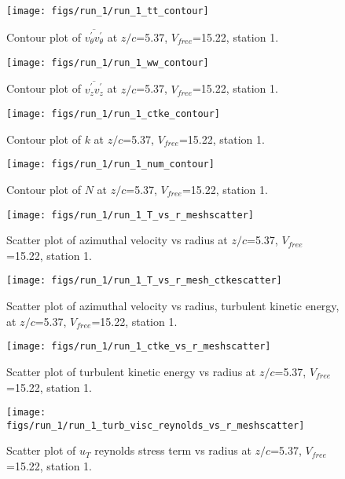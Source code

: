 \begin{figure}[H]
\centering
\texttt{[image: figs/run\_1/run\_1\_tt\_contour]}
\caption{Contour plot of $\overline{v_{\theta}^{\prime} v_{\theta}^{\prime}}$ at $z/c$=5.37, $V_{free}$=15.22, station 1.}
\end{figure}


\begin{figure}[H]
\centering
\texttt{[image: figs/run\_1/run\_1\_ww\_contour]}
\caption{Contour plot of $\overline{v_{z}^{\prime} v_{z}^{\prime}}$ at $z/c$=5.37, $V_{free}$=15.22, station 1.}
\end{figure}


\begin{figure}[H]
\centering
\texttt{[image: figs/run\_1/run\_1\_ctke\_contour]}
\caption{Contour plot of $k$ at $z/c$=5.37, $V_{free}$=15.22, station 1.}
\end{figure}


\begin{figure}[H]
\centering
\texttt{[image: figs/run\_1/run\_1\_num\_contour]}
\caption{Contour plot of $N$ at $z/c$=5.37, $V_{free}$=15.22, station 1.}
\end{figure}


\begin{figure}[H]
\centering
\texttt{[image: figs/run\_1/run\_1\_T\_vs\_r\_meshscatter]}
\caption{Scatter plot of azimuthal velocity vs radius at $z/c$=5.37, $V_{free}$=15.22, station 1.}
\end{figure}


\begin{figure}[H]
\centering
\texttt{[image: figs/run\_1/run\_1\_T\_vs\_r\_mesh\_ctkescatter]}
\caption{Scatter plot of azimuthal velocity vs radius, turbulent kinetic energy, at $z/c$=5.37, $V_{free}$=15.22, station 1.}
\end{figure}


\begin{figure}[H]
\centering
\texttt{[image: figs/run\_1/run\_1\_ctke\_vs\_r\_meshscatter]}
\caption{Scatter plot of turbulent kinetic energy vs radius at $z/c$=5.37, $V_{free}$=15.22, station 1.}
\end{figure}


\begin{figure}[H]
\centering
\texttt{[image: figs/run\_1/run\_1\_turb\_visc\_reynolds\_vs\_r\_meshscatter]}
\caption{Scatter plot of $
u_T$ reynolds stress term vs radius at $z/c$=5.37, $V_{free}$=15.22, station 1.}
\end{figure}


